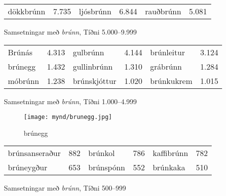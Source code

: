\documentclass[../samsetningasafn.tex]{subfiles}
\begin{document}
\begin{wordlist}[H]
\begin{tcolorbox}

	\setlength{\extrarowheight}{3pt}
	\begin{tabular}{BlBlBl}
		dökkbrúnn		& 7.735		& 		
		ljósbrúnn		& 6.844		& 		
		rauðbrúnn		& 5.081		 	
	\end{tabular}

\end{tcolorbox}
	\caption{Samsetningar með \textit{brúnn}, Tíðni 5.000--9.999}
	\label{listi:brunt.5000}
\end{wordlist}	
		
\begin{wordlist}[H]
\begin{tcolorbox}

	\setlength{\extrarowheight}{3pt}
	\begin{tabular}{BlBlBl}		
		Brúnás		& 4.313		& 		
		gulbrúnn	& 4.144		&   	
		brúnleitur	& 3.124		\\ 		
		brúnegg		& 1.432		& 		
		gullinbrúnn	& 1.310		& 
		grábrúnn	& 1.284		\\ 		
		móbrúnn	& 1.238		& 		
		brúnskjóttur	& 1.020		& 	
		brúnkukrem	& 1.015		 	
	\end{tabular}

\end{tcolorbox}
	\caption{Samsetningar með \textit{brúnn}, Tíðni 1.000--4.999}
	\label{listi:brunt.1000}
\end{wordlist}

\begin{figure}[H]
\begin{tcolorbox}
\centering
	\texttt{[image: mynd/brunegg.jpg]}
\end{tcolorbox}
	\caption{brúnegg}
	\label{mynd:brunegg}
\end{figure}

\begin{wordlist}[H]
\begin{tcolorbox}

	\setlength{\extrarowheight}{3pt}
	\begin{tabular}{BlBlBl}
		brúnsanseraður	& 882		& 		
		brúnkol			& 786		& 		
		kaffibrúnn		& 782		\\ 
		brúneygður		& 653		& 		
		brúnspónn		& 552		&   
		brúnkaka		& 510		 	
	\end{tabular}

\end{tcolorbox}
	\caption{Samsetningar með \textit{brúnn}, Tíðni 500--999}
	\label{listi:brunt.500}
\end{wordlist}	
\end{document}
